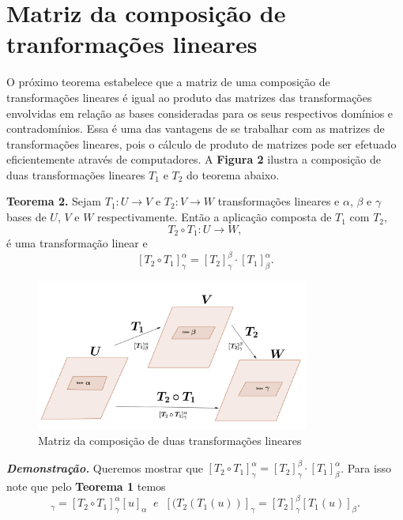 \section{Matriz da composição de tranformações lineares}

O próximo teorema  estabelece que a matriz de uma composição de transformações lineares é igual ao produto das matrizes das transformações envolvidas em relação as bases consideradas para os seus  respectivos domínios e contradomínios.  Essa é uma das vantagens de se trabalhar com as matrizes de transformações lineares,  pois o cálculo de  produto de matrizes pode ser efetuado eficientemente através de computadores. A \textbf{Figura 2} ilustra a composição de duas transformações lineares $T_1$ e $T_2$ do teorema abaixo.

\vspace{0.5cm}

\noindent\textbf{Teorema 2.} Sejam  $T_1: U \rightarrow V$  e $T_2: V \rightarrow W$ transformações lineares e $\alpha$,  $\beta$ e $\gamma$ bases de $U$, $V$ e $W$  respectivamente. Então a aplicação composta de $T_1$ com $T_2$, $$T_2 \circ T_1: U \rightarrow W,$$  é uma transformação linear e $$[T_2 \circ T_1]_{\gamma}^{\alpha}=[T_2 ]_{\gamma}^{\beta} \cdot[T_1]_{\beta}^{\alpha}.$$

\begin{figure}[h]
\center
\includegraphics[width=0.8\textwidth]{chapters/matriz_trans_linear/img/composicao}
\caption{\footnotesize{Matriz da composição de duas transformações lineares}}
\label{fig:exp}
\end{figure}


\noindent\textit{\textbf{Demonstração.}} Queremos mostrar que $[T_2 \circ T_1]_{\gamma}^{\alpha}=[T_2 ]_{\gamma}^{\beta} \cdot[T_1]_{\beta}^{\alpha}$. Para isso note que pelo \textbf{Teorema 1} temos
\begin{equation}
[(T_2 \circ T_1)(u)]_{\gamma}=[T_2 \circ T_1]_{\gamma}^{\alpha}[u]_{\alpha}\;\;  e \;\; [(T_2 ( T_1(u))]_{\gamma}=[T_2 ]_{\gamma}^{\beta}[T_1(u)]_{\beta}. \label{teo21}
\end{equation}

